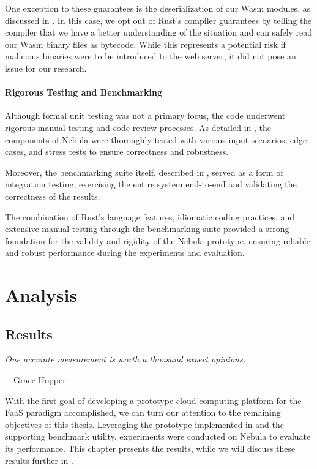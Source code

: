 \documentclass[
  table]{report}
\begin{document}
One exception to these guarantees is the deserialization of our
\ac{Wasm} modules, as discussed in . In
this case, we opt out of Rust's compiler guarantees by telling the
compiler that we have a better understanding of the situation and can
safely read our \ac{Wasm} binary files as bytecode. While this
represents a potential risk if malicious binaries were to be introduced
to the web server, it did not pose an issue for our research.

\subsection{Rigorous Testing and Benchmarking}

Although formal unit testing was not a primary focus, the code underwent
rigorous manual testing and code review processes. As detailed in
, the components of Nebula were thoroughly tested
with various input scenarios, edge cases, and stress tests to ensure
correctness and robustness.

Moreover, the benchmarking suite itself, described in
, served as a form of integration testing,
exercising the entire system end-to-end and validating the correctness
of the results.

The combination of Rust's language features, idiomatic coding practices,
and extensive manual testing through the benchmarking suite provided a
strong foundation for the validity and rigidity of the Nebula prototype,
ensuring reliable and robust performance during the experiments and
evaluation.

\part{Analysis}

\newpage
\chapter{Results}

\setlength{} 
\epigraph{\itshape  
One accurate measurement is worth a thousand expert opinions.
}{---Grace Hopper}

With the first goal of developing a prototype cloud computing platform
for the \ac{FaaS} paradigm accomplished, we can turn our attention to
the remaining objectives of this thesis. Leveraging the prototype
implemented in  and the supporting benchmark
utility, experiments were conducted on Nebula to evaluate its
performance. This chapter presents the results, while we will discuss
these results further in .
\end{document}
